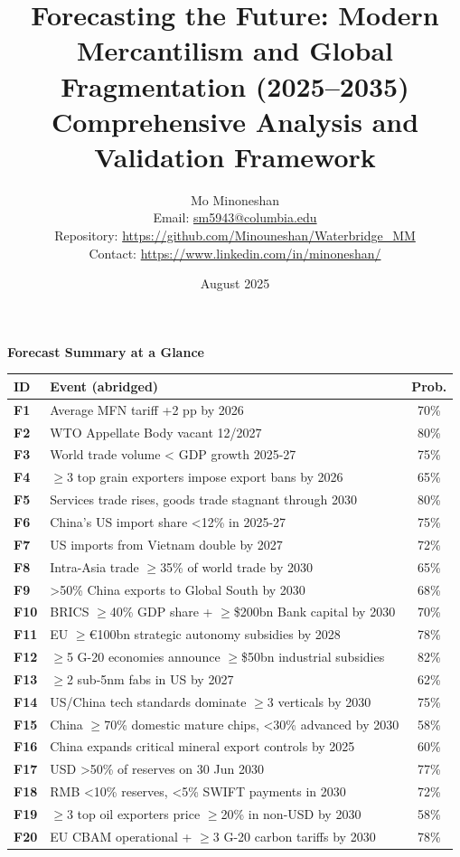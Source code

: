 \documentclass{article}
\title{\textbf{Forecasting the Future: Modern Mercantilism and Global Fragmentation (2025--2035)}\\\Large Comprehensive Analysis and Validation Framework}
\author{Mo Minoneshan\\
\small Email: \url{sm5943@columbia.edu}\\
\small Repository: \url{https://github.com/Minouneshan/Waterbridge_MM}\\
\small Contact: \url{https://www.linkedin.com/in/minoneshan/}}
\date{August 2025}
\newenvironment{landscapetable}{\begin{landscape}\small}{\end{landscape}}
\begin{document}
\maketitle

\tableofcontents
\newpage

\begin{landscapetable}
\captionsetup{type=table}
\caption*{\bfseries Forecast Summary at a Glance}
\begin{tabularx}{\textwidth}{>{\bfseries}lXc}
\toprule
ID & Event (abridged) & Prob.\\
\midrule
F1 & Average MFN tariff +2 pp by 2026 & 70\%\\
F2 & WTO Appellate Body vacant 12/2027 & 80\%\\
F3 & World trade volume < GDP growth 2025-27 & 75\%\\
F4 & $\geq$3 top grain exporters impose export bans by 2026 & 65\%\\
F5 & Services trade rises, goods trade stagnant through 2030 & 80\%\\
F6 & China's US import share <12\% in 2025-27 & 75\%\\
F7 & US imports from Vietnam double by 2027 & 72\%\\
F8 & Intra-Asia trade $\geq$35\% of world trade by 2030 & 65\%\\
F9 & >50\% China exports to Global South by 2030 & 68\%\\
F10 & BRICS $\geq$40\% GDP share + $\geq$\$200bn Bank capital by 2030 & 70\%\\
F11 & EU $\geq$€100bn strategic autonomy subsidies by 2028 & 78\%\\
F12 & $\geq$5 G-20 economies announce $\geq$\$50bn industrial subsidies & 82\%\\
F13 & $\geq$2 sub-5nm fabs in US by 2027 & 62\%\\
F14 & US/China tech standards dominate $\geq$3 verticals by 2030 & 75\%\\
F15 & China $\geq$70\% domestic mature chips, <30\% advanced by 2030 & 58\%\\
F16 & China expands critical mineral export controls by 2025 & 60\%\\
F17 & USD >50\% of reserves on 30 Jun 2030 & 77\%\\
F18 & RMB <10\% reserves, <5\% SWIFT payments in 2030 & 72\%\\
F19 & $\geq$3 top oil exporters price $\geq$20\% in non-USD by 2030 & 58\%\\
F20 & EU CBAM operational + $\geq$3 G-20 carbon tariffs by 2030 & 78\%\\

\end{tabularx}
\end{landscapetable}
\end{document}
